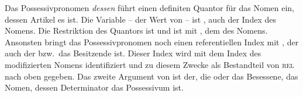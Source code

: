 \zs
Das Possessivpronomen \emph{dessen} führt einen definiten Quantor für das Nomen ein, dessen Artikel
es ist. Die Variable -- der Wert von \argzero{} -- ist , auch der Index des Nomens. Die Restriktion des Quantors ist
 und  ist \qeq mit , dem \ltopw des Nomens. Ansonsten bringt das
Possessivpronomen noch einen referentiellen Index mit , der auch der bzw.\ das Besitzende
ist. Dieser Index wird mit dem Index des modifizierten Nomens identifiziert und zu diesem Zwecke als
Bestandteil von \textsc{rel} nach oben gegeben. Das zweite Argument von 
 ist der, die oder das Besessene, das Nomen, dessen Determinator das Possessivum ist.


